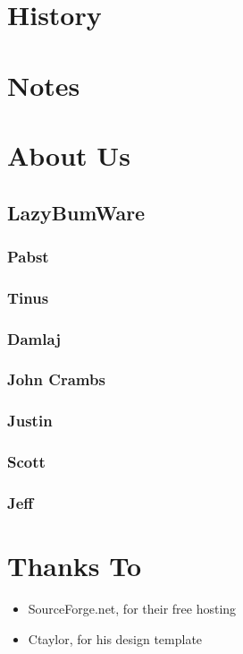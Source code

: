 \documentclass[a4paper]{report}
\begin{document}
	\chapter{History}

	\chapter{Notes}

	\chapter{About Us}

		\section{LazyBumWare}

			\subsection{Pabst}

			\subsection{Tinus}

			\subsection{Damlaj}

			\subsection{John Crambs}

			\subsection{Justin}

			\subsection{Scott}

			\subsection{Jeff}

	\chapter{Thanks To}
		
		\begin{itemize}
			\item SourceForge.net, for their free hosting
			\item Ctaylor, for his design template
		\end{itemize}
\end{document}
